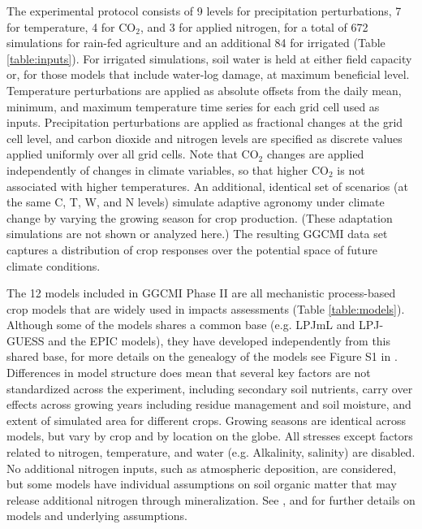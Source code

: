 \documentclass[preprint, 5p, times, twocolumn]{elsarticle}
\begin{document}
{The experimental protocol consists of 9 levels for precipitation perturbations, 7 for temperature, 4 for CO$_2$, and 3 for applied nitrogen, for a total of 672 simulations for rain-fed agriculture and an additional 84 for irrigated (Table \ref{table:inputs}). For irrigated simulations, soil water is held at either field capacity or, for those models that include water-log damage, at maximum beneficial level.  Temperature perturbations are applied as absolute offsets from the daily mean, minimum, and maximum temperature time series for each grid cell used as inputs. Precipitation perturbations are applied as fractional changes at the grid cell level, and carbon dioxide and nitrogen levels are specified as discrete values applied uniformly over all grid cells. Note that CO$_2$ changes are applied independently of changes in climate variables, so that higher CO$_2$ is not associated with higher temperatures. An additional, identical set of scenarios (at the same C, T, W, and N levels) simulate adaptive agronomy under climate change by varying the growing season for crop production. (These adaptation simulations are not shown or analyzed here.) The resulting GGCMI data set captures a distribution of crop responses over the potential space of future climate conditions.

The 12 models included in GGCMI Phase II are all mechanistic process-based crop models that are widely used in impacts assessments (Table \ref{table:models}). Although some of the models shares a common base (e.g. LPJmL and LPJ-GUESS and the EPIC models), they have developed independently from this shared base, for more details on the genealogy of the models see Figure S1 in \citet{Rosenzweig2014}. Differences in model structure does mean that several key factors are not standardized across the experiment, including secondary soil nutrients, carry over effects across growing years including residue management and soil moisture, and extent of simulated area for different crops. Growing seasons are identical across models, but vary by crop and by location on the globe. All stresses except factors related to nitrogen, temperature, and water (e.g. Alkalinity, salinity) are disabled. No additional nitrogen inputs, such as atmospheric deposition, are considered, but some models have individual assumptions on soil organic matter that may release additional nitrogen through mineralization. See \citet{Rosenzweig2014}, \citet{Elliott2015} and \citet{muller_global_2017} for further details on models and underlying assumptions.

}
\end{document}
